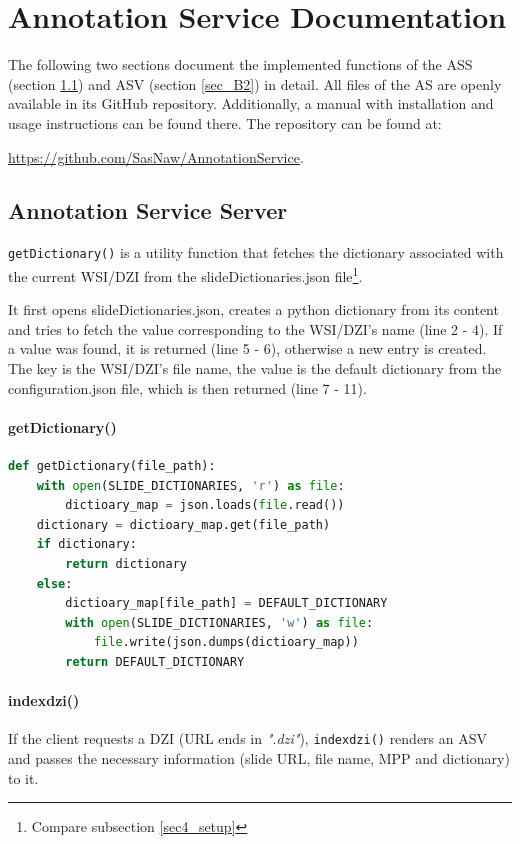 \chapter{Annotation Service Documentation}

The following two sections document the implemented functions of the ASS (section \ref{sec_B1}) and ASV (section \ref{sec_B2}) in detail. All files of the AS are openly available in its GitHub repository. Additionally, a manual with installation and usage instructions can be found there. The repository can be found at:

 \url{https://github.com/SasNaw/AnnotationService}.

\section{Annotation Service Server}
\label{sec_B1}

\texttt{getDictionary()} is a utility function that fetches the dictionary associated with the current WSI/DZI from the slideDictionaries.json file\footnote{
	Compare subsection \ref{sec4_setup}
}.

It first opens slideDictionaries.json, creates a python dictionary from its content and tries to fetch the value corresponding to the WSI/DZI's name (line 2 - 4). If a value was found, it is returned (line 5 - 6), otherwise a new entry is created. The key is the WSI/DZI's file name, the value is the default dictionary from the configuration.json file, which is then returned (line 7 - 11).

\subsubsection{getDictionary()}
\begin{lstlisting}[language=Python, frame=single]
def getDictionary(file_path):
	with open(SLIDE_DICTIONARIES, 'r') as file:
		dictioary_map = json.loads(file.read())
	dictionary = dictioary_map.get(file_path)
	if dictionary:
		return dictionary
	else:
		dictioary_map[file_path] = DEFAULT_DICTIONARY
		with open(SLIDE_DICTIONARIES, 'w') as file:
			file.write(json.dumps(dictioary_map))
		return DEFAULT_DICTIONARY
\end{lstlisting}

\subsubsection{index{\textunderscore}dzi()}
If the client requests a DZI (URL ends in \emph{".dzi"}), \texttt{index{\textunderscore}dzi()} renders an ASV and passes the necessary information (slide URL, file name, MPP and dictionary) to it.

